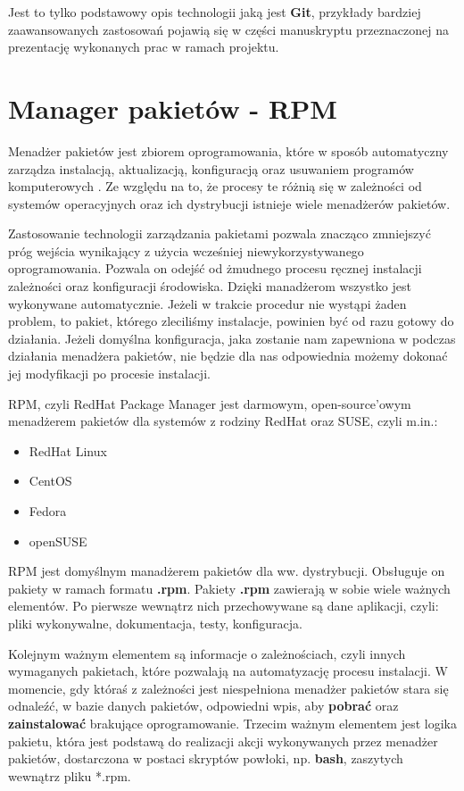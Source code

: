 Jest to tylko podstawowy opis technologii jaką jest \textbf{Git}, przykłady bardziej zaawansowanych zastosowań pojawią się w części manuskryptu przeznaczonej na prezentację wykonanych prac w ramach projektu.


\section{Manager pakietów - RPM}
Menadżer pakietów jest zbiorem oprogramowania, które w sposób automatyczny zarządza instalacją, aktualizacją, konfiguracją oraz usuwaniem programów komputerowych \cite{ManagerWiki}. Ze względu na to, że procesy te różnią się w zależności od systemów operacyjnych oraz ich dystrybucji istnieje wiele menadżerów pakietów.\par

Zastosowanie technologii zarządzania pakietami pozwala znacząco zmniejszyć próg wejścia wynikający z użycia wcześniej niewykorzystywanego oprogramowania. Pozwala on odejść od żmudnego procesu ręcznej instalacji zależności oraz konfiguracji środowiska. Dzięki manadżerom wszystko jest wykonywane automatycznie. Jeżeli w trakcie procedur nie wystąpi żaden problem, to pakiet, którego zleciliśmy instalacje, powinien być od razu gotowy do działania. Jeżeli domyślna konfiguracja, jaka zostanie nam zapewniona w podczas działania menadżera pakietów, nie będzie dla nas odpowiednia możemy dokonać jej modyfikacji po procesie instalacji.

\newpage
RPM, czyli RedHat Package Manager jest darmowym, open-source'owym menadżerem pakietów dla systemów z rodziny RedHat oraz SUSE, czyli m.in.:
\begin{itemize}
\item RedHat Linux
\item CentOS
\item Fedora
\item openSUSE
\end{itemize}\par
RPM jest domyślnym manadżerem pakietów dla ww. dystrybucji. Obsługuje on pakiety w ramach formatu \textbf{.rpm}. Pakiety \textbf{.rpm} zawierają w sobie wiele ważnych elementów. Po pierwsze wewnątrz nich przechowywane są dane aplikacji, czyli: pliki wykonywalne, dokumentacja, testy, konfiguracja.\par 
Kolejnym ważnym elementem są informacje o zależnościach, czyli innych wymaganych pakietach, które pozwalają na automatyzację procesu instalacji. W momencie, gdy któraś z zależności jest niespełniona menadżer pakietów stara się odnaleźć, w bazie danych pakietów, odpowiedni wpis, aby \textbf{pobrać} oraz \textbf{zainstalować} brakujące oprogramowanie. Trzecim ważnym elementem jest logika pakietu, która jest podstawą do realizacji akcji wykonywanych przez menadżer pakietów, dostarczona w postaci skryptów powłoki, np. \textbf{bash}, zaszytych wewnątrz pliku *.rpm.

